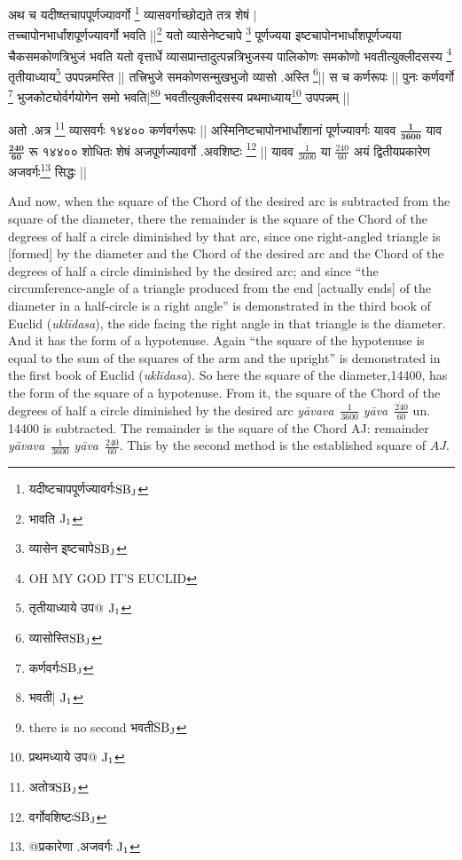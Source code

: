 \documentclass[11pt,a5paper]{book}
\def\yava{\textit{y\=ava}}
\def\yavava{\textit{y\=avava}}
\begin{document}
\newpage
{\s अथ च यदीष्ष्तचापपूर्णज्यावर्गो \footnote{{\s यदीष्टचापपूर्णज्यावर्गः}${\rm SB_J}$} व्यासवर्गाच्छोद्यते
तत्र शेषं
$|$ \\
तच्चापोनभार्धांशपूर्णज्यावर्गो
भवति ||\footnote{{\s भावति }${\rm J_1}$}
यतो व्यासेनेष्टचापे \footnote{{\s व्यासेन इ्ष्टचापे}${\rm SB_J}$} पूर्णज्यया इष्टचापोनभार्धांशपूर्णज्यया
चैकसमकोणत्रि\-भुजं भवति यतो वृत्तार्धे व्यासप्रान्तादुत्पन्नत्रिभुजस्य
पालिकोणः समकोणो
भवतीत्युक्लीदसस्य \footnote{OH MY GOD IT'S EUCLID}
तृतीयाध्याय\footnote{{\s तृतीयाध्याये उप@ }${\rm J_1}$}
उपपन्न\-मस्ति ||
तत्त्रिभुजे
समकोणसन्मुखभुजो व्यासो .अस्ति \footnote{{\s व्यासोस्ति}${\rm SB_J}$}||
स च कर्णरूपः ||
पुनः कर्णवर्गो \footnote{{\s कर्णवर्गः}${\rm SB_J}$} भुजकोट्योर्वर्गयोगेन समो
भवति|\footnote{{\s भवती| }${\rm J_1}$}\footnote{{there is no second भवती}${\rm SB_J}$}
भवतीत्युक्लीदसस्य
प्रथमाध्याय\footnote{{\s प्रथमध्याये उप@ }${\rm J_1}$}
उपपन्नम् ||

अतो .अत्र \footnote{{\s अतोत्र}${\rm SB_J}$} व्यासवर्गः १४४०० कर्णवर्गरूपः ||
अस्मिनिष्टचापोनभार्धांशानां पूर्णज्यावर्गः
यावव $\bm{\frac{1}{3600}}$ याव $\bm{\frac{\dot{240}}{60}}$
रू १४४००
शोधितः शेषं अजपूर्णज्यावर्गो .अवशिष्टः \footnote{{\s वर्गोवशिष्टः}${\rm SB_J}$} ||
यावव %
$\frac{\dot{1}}{3600}$ या $\frac{240}{60}$ अयं
द्वितीयप्रकारेण अजवर्गः\footnote{{\s @प्रकारेणा .अजवर्गः }${\rm J_1}$}
सिद्धः ||}

\newpage
And now, when the square of the Chord of the desired arc is subtracted from the square of the
diameter, there the remainder  is the square of the Chord of the degrees 
of half a circle diminished by that arc, since one right-angled triangle is [formed] by the diameter
and the Chord of the desired arc and the Chord of the degrees of half a circle diminished by the desired arc; 
and since ``the circumference-angle of a triangle produced from the end [actually ends] of the diameter 
in a half-circle is a right angle'' is demonstrated in the third book of Euclid (\textit{uklīdasa}), 
the side facing the right angle in that triangle is the diameter. And it 
has the form of a hypotenuse. Again ``the square of the hypotenuse
is equal to the sum of the squares of the arm and the upright'' is demonstrated in the first book of Euclid (\textit{uklīdasa}). 
So here the square of the diameter,14400, has the form of the square of a hypotenuse. From it, the square of the Chord of the 
degrees of half a circle diminished by the desired arc \yavava\ $\frac{1}{3600}$ \yava\ $\frac{\dot{240}}{60}$ un. 14400 is subtracted. 
The remainder is the square of the Chord AJ: 
remainder \yavava\ $\frac{\dot{1}}{3600}$ \yava\ $\frac{240}{60}$.
This by the second method is the established square of $AJ$.
\end{document}
